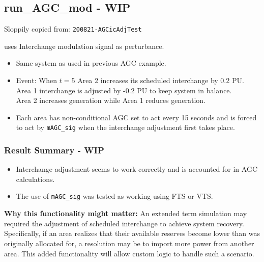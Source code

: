 \pagebreak
\subsection{run\_AGC\_mod - WIP}
Sloppily copied from: \verb|200821-AGCicAdjTest|

uses Interchange modulation signal as perturbance.

\begin{itemize}
\raggedright
\item Same system as used in previous AGC example.
\item Event: When $t=5$ Area 2 increases its scheduled interchange by 0.2 PU.\\
Area 1 interchange is adjusted by -0.2 PU to keep system in balance.\\
Area 2 increases generation while Area 1 reduces generation.

\item Each area has non-conditional AGC set to act every 15 seconds and is forced to act by \verb|mAGC_sig| when the interchange adjustment first takes place.

\end{itemize}

\subsubsection{Result Summary - WIP}
\begin{itemize}
\item Interchange adjustment seems to work correctly and is accounted for in AGC calculations.
\item The use of \verb|mAGC_sig| was tested as working using FTS or VTS.
\end{itemize}

\textbf{Why this functionality might matter: }
An extended term simulation may required the adjustment of scheduled interchange to achieve system recovery.
Specifically, if an area realizes that their available reserves become lower than was originally allocated for, a resolution may be to import more power from another area.
This added functionality will allow custom logic to handle such a scenario.


